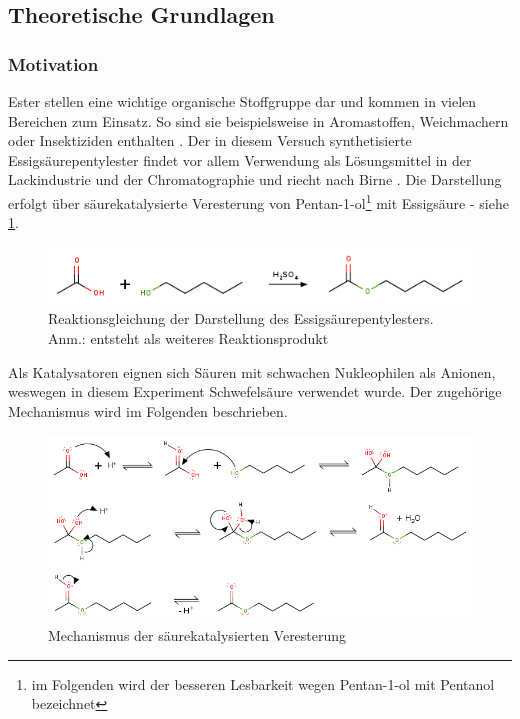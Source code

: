 \documentclass{article}
\begin{document}
    \subsection{Theoretische Grundlagen}
  
      \subsubsection{Motivation} \label{sec:Motivation}
  
        Ester stellen eine wichtige organische Stoffgruppe dar und kommen in vielen Bereichen zum Einsatz. So sind sie beispielsweise in Aromastoffen, Weichmachern oder Insektiziden enthalten \cite{EsterEigenschaften}. Der in diesem Versuch synthetisierte Essigsäurepentylester findet vor allem Verwendung als Lösungsmittel in der Lackindustrie und der Chromatographie und riecht nach Birne \cite{Essigsaurepentyl}. Die Darstellung erfolgt über säurekatalysierte Veresterung von Pentan-1-ol\footnote{im Folgenden wird der besseren Lesbarkeit wegen Pentan-1-ol mit Pentanol bezeichnet} mit Essigsäure - siehe \ref{fig:EssigsaureReaktion}. 
        
        \begin{figure}[h]
          \includegraphics[scale=0.6, center]{Graphiken/Reaktionen/ReactionEsters.png} 
          \caption[Reaktionsgleichung der Darstellung des Essigsäurepentylesters, Quelle: Autor]{Reaktionsgleichung der Darstellung des Essigsäurepentylesters. Anm.:  entsteht als weiteres Reaktionsprodukt}
          \label{fig:EssigsaureReaktion}
        \end{figure}
        
        Als Katalysatoren eignen sich Säuren mit schwachen Nukleophilen als Anionen, weswegen in diesem Experiment Schwefelsäure verwendet wurde. Der zugehörige Mechanismus wird im Folgenden beschrieben.
        
        \begin{figure}[h]
          \includegraphics[scale=0.6, center]{Graphiken/Reaktionen/MechanismVeresterung.png} 
          \caption[Reaktionsgleichung Mechanismus der Veresterung, Quelle: Autor]{Mechanismus der säurekatalysierten Veresterung \cite[S. 208]{Clayden}}
          \label{fig:Mechanismus}
        \end{figure}
        
\end{document}
